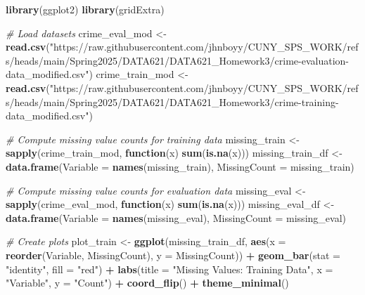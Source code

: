 \documentclass[
]{article}
\newenvironment{Shaded}{\begin{snugshade}}{\end{snugshade}}
\newcommand{\AttributeTok}[1]{\textcolor[rgb]{0.13,0.29,0.53}{#1}}
\newcommand{\CommentTok}[1]{\textcolor[rgb]{0.56,0.35,0.01}{\textit{#1}}}
\newcommand{\ControlFlowTok}[1]{\textcolor[rgb]{0.13,0.29,0.53}{\textbf{#1}}}
\newcommand{\FunctionTok}[1]{\textcolor[rgb]{0.13,0.29,0.53}{\textbf{#1}}}
\newcommand{\NormalTok}[1]{#1}
\newcommand{\OtherTok}[1]{\textcolor[rgb]{0.56,0.35,0.01}{#1}}
\newcommand{\SpecialCharTok}[1]{\textcolor[rgb]{0.81,0.36,0.00}{\textbf{#1}}}
\newcommand{\StringTok}[1]{\textcolor[rgb]{0.31,0.60,0.02}{#1}}
\begin{document}
\begin{Shaded}
\begin{Highlighting}[]
\FunctionTok{library}\NormalTok{(ggplot2)}
\FunctionTok{library}\NormalTok{(gridExtra)}

\CommentTok{\# Load datasets}
\NormalTok{crime\_eval\_mod }\OtherTok{\textless{}{-}} \FunctionTok{read.csv}\NormalTok{(}\StringTok{"https://raw.githubusercontent.com/jhnboyy/CUNY\_SPS\_WORK/refs/heads/main/Spring2025/DATA621/DATA621\_Homework3/crime{-}evaluation{-}data\_modified.csv"}\NormalTok{)}
\NormalTok{crime\_train\_mod }\OtherTok{\textless{}{-}} \FunctionTok{read.csv}\NormalTok{(}\StringTok{"https://raw.githubusercontent.com/jhnboyy/CUNY\_SPS\_WORK/refs/heads/main/Spring2025/DATA621/DATA621\_Homework3/crime{-}training{-}data\_modified.csv"}\NormalTok{)}

\CommentTok{\# Compute missing value counts for training data}
\NormalTok{missing\_train }\OtherTok{\textless{}{-}} \FunctionTok{sapply}\NormalTok{(crime\_train\_mod, }\ControlFlowTok{function}\NormalTok{(x) }\FunctionTok{sum}\NormalTok{(}\FunctionTok{is.na}\NormalTok{(x)))}
\NormalTok{missing\_train\_df }\OtherTok{\textless{}{-}} \FunctionTok{data.frame}\NormalTok{(}\AttributeTok{Variable =} \FunctionTok{names}\NormalTok{(missing\_train), }\AttributeTok{MissingCount =}\NormalTok{ missing\_train)}

\CommentTok{\# Compute missing value counts for evaluation data}
\NormalTok{missing\_eval }\OtherTok{\textless{}{-}} \FunctionTok{sapply}\NormalTok{(crime\_eval\_mod, }\ControlFlowTok{function}\NormalTok{(x) }\FunctionTok{sum}\NormalTok{(}\FunctionTok{is.na}\NormalTok{(x)))}
\NormalTok{missing\_eval\_df }\OtherTok{\textless{}{-}} \FunctionTok{data.frame}\NormalTok{(}\AttributeTok{Variable =} \FunctionTok{names}\NormalTok{(missing\_eval), }\AttributeTok{MissingCount =}\NormalTok{ missing\_eval)}

\CommentTok{\# Create plots}
\NormalTok{plot\_train }\OtherTok{\textless{}{-}} \FunctionTok{ggplot}\NormalTok{(missing\_train\_df, }\FunctionTok{aes}\NormalTok{(}\AttributeTok{x =} \FunctionTok{reorder}\NormalTok{(Variable, MissingCount), }\AttributeTok{y =}\NormalTok{ MissingCount)) }\SpecialCharTok{+}
  \FunctionTok{geom\_bar}\NormalTok{(}\AttributeTok{stat =} \StringTok{"identity"}\NormalTok{, }\AttributeTok{fill =} \StringTok{"red"}\NormalTok{) }\SpecialCharTok{+}
  \FunctionTok{labs}\NormalTok{(}\AttributeTok{title =} \StringTok{"Missing Values: Training Data"}\NormalTok{, }\AttributeTok{x =} \StringTok{"Variable"}\NormalTok{, }\AttributeTok{y =} \StringTok{"Count"}\NormalTok{) }\SpecialCharTok{+}
  \FunctionTok{coord\_flip}\NormalTok{() }\SpecialCharTok{+}
  \FunctionTok{theme\_minimal}\NormalTok{()}


\end{Highlighting}
\end{Shaded}
\end{document}
